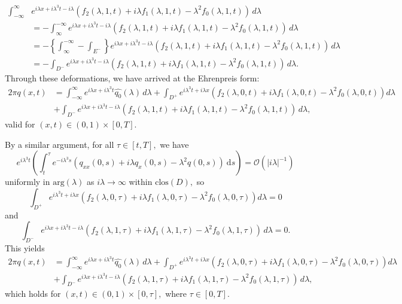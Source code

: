 \begin{align*}
    \int_{-\infty}^\infty &e^{i\lambda x+i \lambda^3 t-i\lambda} \left(f_2(\lambda, 1, t) + i \lambda f_1(\lambda, 1, t) - \lambda^2 f_0(\lambda, 1, t)\right)\,d\lambda \\
    &= - \int_{\infty}^{-\infty} e^{i\lambda x+i \lambda^3 t-i\lambda} \left(f_2(\lambda, 1, t) + i \lambda f_1(\lambda, 1, t) - \lambda^2 f_0(\lambda, 1, t)\right)\,d\lambda \\
    &= - \left\{ \int_{\infty}^{-\infty} - \int_{E^-} \right\} e^{i\lambda x+i \lambda^3 t-i\lambda} \left(f_2(\lambda, 1, t) + i \lambda f_1(\lambda, 1, t) - \lambda^2 f_0(\lambda, 1, t)\right)\,d\lambda \\
    &= -\int_{D^-} e^{i\lambda x+i \lambda^3 t-i\lambda} \left(f_2(\lambda, 1, t) + i \lambda f_1(\lambda, 1, t) - \lambda^2 f_0(\lambda, 1, t)\right)\,d\lambda.
\end{align*}
Through these deformations, we have arrived at the Ehrenpreis form:
\begin{equation*}\label{EFt}
\begin{aligned}
2\pi q(x, t) &= \int_{-\infty}^\infty e^{i\lambda x + i \lambda^3 t}\hat{q_0}(\lambda)\,d\lambda + \int_{D^+} e^{i \lambda^3 t+i\lambda x}\left(f_2(\lambda, 0, t) + i \lambda f_1(\lambda, 0, t) - \lambda^2 f_0(\lambda, 0, t)\right)d\lambda \\
&+\int_{D^-} e^{i\lambda x+i \lambda^3 t-i\lambda} \left(f_2(\lambda, 1, t) + i \lambda f_1(\lambda, 1, t) - \lambda^2 f_0(\lambda, 1, t)\right)\,d\lambda,
\end{aligned}\tag{EF$t$}
\end{equation*}
valid for $(x, t) \in (0,1) \times[0,T].$

By a similar argument, for all $\tau \in [t,T],$ we have  
\[ e^{i \lambda^3 t} \left(\int_{t}^{\tau} e^{- i \lambda^3 s}\left(q_{xx}(0, s) + i \lambda q_x(0, s) - \lambda^2 q(0, s)\right) ~ \mathrm{d}s \right) = \mathcal{O}(|i\lambda|^{-1})\]
uniformly in $\mathrm{arg}(\lambda)$ as $i\lambda \to \infty$ within $\mathrm{clos}(D),$ so
\[ \int_{D^+} e^{i \lambda^3 t+i\lambda x}\left(f_2(\lambda, 0, \tau) + i \lambda f_1(\lambda, 0, \tau) - \lambda^2 f_0(\lambda, 0, \tau)\right)d\lambda = 0\]
and 
\[ \int_{D^-} e^{i\lambda x+i \lambda^3 t-i\lambda} \left(f_2(\lambda, 1, \tau) + i \lambda f_1(\lambda, 1, \tau) - \lambda^2 f_0(\lambda, 1, \tau)\right)\,d\lambda = 0.\]
This yields
\begin{equation*} \label{EFtau}
\begin{aligned}
2\pi q(x, t) &= \int_{-\infty}^\infty e^{i\lambda x + i \lambda^3 t}\hat{q_0}(\lambda)\,d\lambda + \int_{D^+} e^{i \lambda^3 t+i\lambda x}\left(f_2(\lambda, 0, \tau) + i \lambda f_1(\lambda, 0, \tau) - \lambda^2 f_0(\lambda, 0, \tau)\right)d\lambda \\
&+\int_{D^-} e^{i\lambda x+i \lambda^3 t-i\lambda} \left(f_2(\lambda, 1, \tau) + i \lambda f_1(\lambda, 1, \tau) - \lambda^2 f_0(\lambda, 1, \tau)\right)\,d\lambda,
\end{aligned}\tag{EF$\tau$}
\end{equation*}
which holds for $(x,t) \in (0,1)\times[0,\tau],$ where $\tau \in [0,T].$
